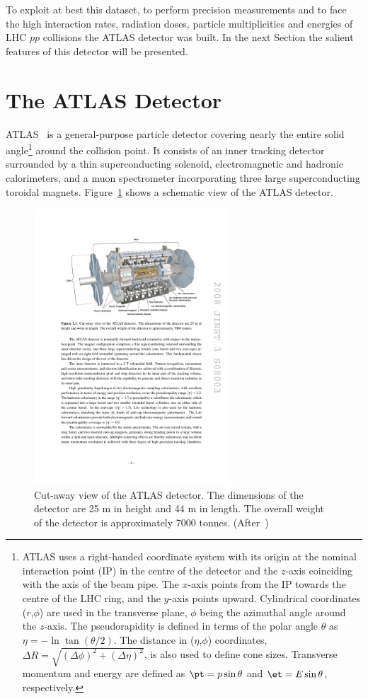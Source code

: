 To exploit at best this dataset, to perform precision measurements 
and to face the high interaction rates, radiation doses, particle multiplicities and energies of 
LHC $pp$ collisions the ATLAS detector was built. In the next Section the salient features of this 
detector will be presented.

\section{The ATLAS Detector}
\label{sec:ATLASDetector}
ATLAS~\cite{AtlasDetector} is a general-purpose particle detector covering nearly the entire solid 
angle\footnote{ATLAS uses a right-handed coordinate system with its origin at the nominal interaction 
point (IP) in the centre of the detector and the $z$-axis coinciding with the axis of the beam pipe.  The 
$x$-axis points from the IP towards the centre of the LHC ring, and the $y$-axis points upward. 
Cylindrical coordinates ($r$,$\phi$) are used in the transverse plane, $\phi$ being the azimuthal angle 
around the $z$-axis. The pseudorapidity is defined in terms of the polar angle $\theta$ as $\eta = - \ln 
\tan(\theta/2)$. The distance in ($\eta$,$\phi$) coordinates, $\Delta R = \sqrt{(\Delta\phi)^2+
(\Delta\eta)^2}$, is also used to define cone sizes. Transverse momentum and energy are defined as $
\pt=p\sin\theta$ and $\et=E\sin\theta$, respectively.} around the collision point. It consists of an inner 
tracking detector surrounded by a thin superconducting solenoid, electromagnetic and hadronic 
calorimeters,
and a muon spectrometer incorporating three large superconducting toroidal magnets. 
Figure~\ref{fig:ATLASDetector} shows a schematic view of the ATLAS detector.

\begin{figure}[!htpb]
\centering
\includegraphics[width=0.65\textwidth]{ATLASDetector.pdf}
\caption{\label{fig:ATLASDetector}Cut-away view of the ATLAS detector. The dimensions of the detector are 25 m in height and 44 m in length. The overall weight of the detector is approximately 7000 tonnes.
 (After~\cite{AtlasDetector})}
\end{figure}


